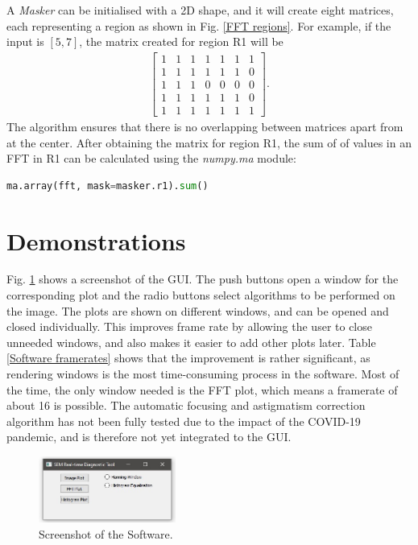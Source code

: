 \documentclass[conference]{IEEEtran}
\begin{document}
A \textit{Masker} can be initialised with a 2D shape, and it will create eight matrices, each representing a region as shown in Fig. \ref{FFT regions}. For example, if the input is $[5, 7]$, the matrix created for region R1 will be
\begin{align*}
\begin{bmatrix}
1 & 1 & 1 & 1 & 1 & 1 & 1\\
1 & 1 & 1 & 1 & 1 & 1 & 0\\
1 & 1 & 1 & 0 & 0 & 0 & 0\\
1 & 1 & 1 & 1 & 1 & 1 & 0\\
1 & 1 & 1 & 1 & 1 & 1 & 1
\end{bmatrix}.
\end{align*}
The algorithm ensures that there is no overlapping between matrices apart from at the center. After obtaining the matrix for region R1, the sum of of values in an FFT in R1 can be calculated using the \textit{numpy.ma} module:
\begin{lstlisting}[language=Python]
    ma.array(fft, mask=masker.r1).sum()
\end{lstlisting}

\section{Demonstrations}
Fig. \ref{Software screenshot} shows a screenshot of the GUI. The push buttons open a window for the corresponding plot and the radio buttons select algorithms to be performed on the image. The plots are shown on different windows, and can be opened and closed individually. This improves frame rate by allowing the user to close unneeded windows, and also makes it easier to add other plots later. Table \ref{Software framerates} shows that the improvement is rather significant, as rendering windows is the most time-consuming process in the software. Most of the time, the only window needed is the FFT plot, which means a framerate of about 16 is possible. The automatic focusing and astigmatism correction algorithm has not been fully tested due to the impact of the COVID-19 pandemic, and is therefore not yet integrated to the GUI.

\begin{figure}[htbp]
    \centering
    \includegraphics[width=0.4\textwidth]{Images/Software screenshot.jpg}
    \caption{Screenshot of the Software.}
    \label{Software screenshot}
\end{figure}
\end{document}
